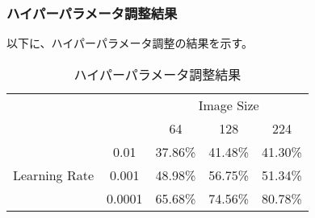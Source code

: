 \documentclass[a4paper, 11pt, titlepage]{jsarticle}
\begin{document}
\subsubsection{ハイパーパラメータ調整結果}
以下に、ハイパーパラメータ調整の結果を示す。
\begin{table}[H]
  \centering
  \caption{ハイパーパラメータ調整結果}
  \label{tab:hyperparameter_tuning}
  \begin{tabular}{|c|c|c|c|c|}
    \hline
    \multicolumn{2}{|c|}{} & \multicolumn{3}{c|}{Image Size} \\
    \cline{3-5}
    \multicolumn{2}{|c|}{} & 64 & 128 & 224 \\
    \hline
    \multirow{3}{*}{Learning Rate} & 0.01 & 37.86\% & 41.48\% & 41.30\% \\
    \cline{2-5}
    & 0.001 & 48.98\% & 56.75\% & 51.34\% \\
    \cline{2-5}
    & 0.0001 & 65.68\% & 74.56\% & 80.78\% \\
    \hline
  \end{tabular}
\end{table}
\end{document}
